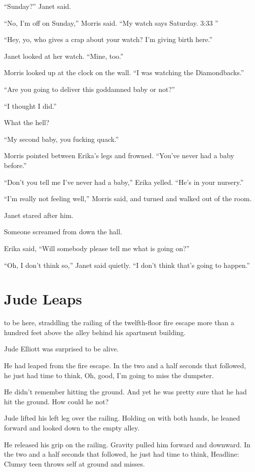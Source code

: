 “Sunday?” Janet said.

“No, I’m off on Sunday,” Morris said. “My watch says Saturday. 3:33 ”

“Hey, yo, who gives a crap about your watch? I’m giving birth here.”

Janet looked at her watch. “Mine, too.”

Morris looked up at the clock on the wall. “I was watching the Diamondbacks.”

“Are you going to deliver this goddamned baby or not?”

“I thought I did.”

What the hell?

“My second baby, you fucking quack.”

Morris pointed between Erika’s legs and frowned. “You’ve never had a baby before.”

“Don’t you tell me I’ve never had a baby,” Erika yelled. “He’s in your nursery.”

“I’m really not feeling well,” Morris said, and turned and walked out of the room.

Janet stared after him.

Someone screamed from down the hall.

Erika said, “Will somebody please tell me what is going on?”

“Oh, I don’t think so,” Janet said quietly. “I don’t think that’s going to happen.”



\chapter{Jude Leaps}

 to be here, straddling the railing of the twelfth-floor fire escape more than a hundred feet above the alley behind his apartment building.

Jude Elliott was surprised to be alive.

He had leaped from the fire escape. In the two and a half seconds that followed, he just had time to think, Oh, good, I’m going to miss the dumpster.

He didn’t remember hitting the ground. And yet he was pretty sure that he had hit the ground. How could he not?

Jude lifted his left leg over the railing. Holding on with both hands, he leaned forward and looked down to the empty alley.

He released his grip on the railing. Gravity pulled him forward and downward. In the two and a half seconds that followed, he just had time to think, Headline: Clumsy teen throws self at ground and misses.

